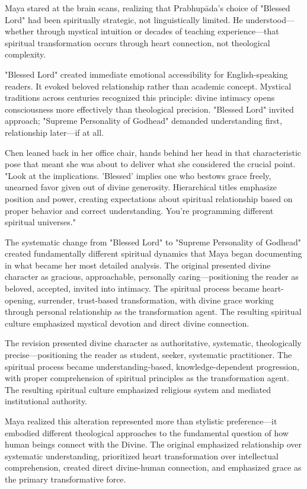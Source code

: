 \documentclass[12pt,twoside]{book}
\begin{document}
Maya stared at the brain scans, realizing that Prabhupāda's choice of "Blessed Lord" had been spiritually strategic, not linguistically limited. He understood—whether through mystical intuition or decades of teaching experience—that spiritual transformation occurs through heart connection, not theological complexity.

"Blessed Lord" created immediate emotional accessibility for English-speaking readers. It evoked beloved relationship rather than academic concept. Mystical traditions across centuries recognized this principle: divine intimacy opens consciousness more effectively than theological precision. "Blessed Lord" invited approach; "Supreme Personality of Godhead" demanded understanding first, relationship later—if at all.

Chen leaned back in her office chair, hands behind her head in that characteristic pose that meant she was about to deliver what she considered the crucial point. "Look at the implications. 'Blessed' implies one who bestows grace freely, unearned favor given out of divine generosity. Hierarchical titles emphasize position and power, creating expectations about spiritual relationship based on proper behavior and correct understanding. You're programming different spiritual universes."

The systematic change from "Blessed Lord" to "Supreme Personality of Godhead" created fundamentally different spiritual dynamics that Maya began documenting in what became her most detailed analysis. The original presented divine character as gracious, approachable, personally caring—positioning the reader as beloved, accepted, invited into intimacy. The spiritual process became heart-opening, surrender, trust-based transformation, with divine grace working through personal relationship as the transformation agent. The resulting spiritual culture emphasized mystical devotion and direct divine connection.

The revision presented divine character as authoritative, systematic, theologically precise—positioning the reader as student, seeker, systematic practitioner. The spiritual process became understanding-based, knowledge-dependent progression, with proper comprehension of spiritual principles as the transformation agent. The resulting spiritual culture emphasized religious system and mediated institutional authority.

Maya realized this alteration represented more than stylistic preference—it embodied different theological approaches to the fundamental question of how human beings connect with the Divine. The original emphasized relationship over systematic understanding, prioritized heart transformation over intellectual comprehension, created direct divine-human connection, and emphasized grace as the primary transformative force.
\end{document}
